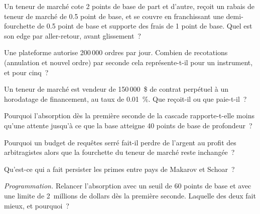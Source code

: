\begin{exercise}[$\star$]\label{exo:hf:crypto-high-frequency-trading-on-centralised-venues:1}
Un teneur de marché cote 2 points de base de part et d'autre, reçoit un rabais de teneur de marché de 0.5 point de base, et se couvre en franchissant
une demi-fourchette de 0.5 point de base et supporte des frais de 1 point de base. Quel est son edge par aller-retour, avant glissement~?
\end{exercise}

\begin{exercise}[$\star$]\label{exo:hf:crypto-high-frequency-trading-on-centralised-venues:2}
Une plateforme autorise 200\,000 ordres par jour. Combien de recotations (annulation et nouvel ordre) par seconde cela représente-t-il pour un instrument, et pour cinq~?
\end{exercise}

\begin{exercise}[$\star$]\label{exo:hf:crypto-high-frequency-trading-on-centralised-venues:3}
Un teneur de marché est vendeur de 150\,000~\$ de contrat perpétuel à un horodatage de financement, au taux de 0.01~\%. Que reçoit-il ou que paie-t-il~?
\end{exercise}

\begin{exercise}[$\star\star$]\label{exo:hf:crypto-high-frequency-trading-on-centralised-venues:4}
Pourquoi l'absorption dès la première seconde de la cascade rapporte-t-elle moins qu'une attente jusqu'à ce que la base atteigne 40 points de base de profondeur~?
\end{exercise}

\begin{exercise}[$\star\star$]\label{exo:hf:crypto-high-frequency-trading-on-centralised-venues:5}
Pourquoi un budget de requêtes serré fait-il perdre de l'argent au profit des arbitragistes alors que la fourchette du teneur de marché reste inchangée~?
\end{exercise}

\begin{exercise}[$\star\star$]\label{exo:hf:crypto-high-frequency-trading-on-centralised-venues:6}
Qu'est-ce qui a fait persister les primes entre pays de Makarov et Schoar~?
\end{exercise}

\begin{exercise}[$\star\star\star$]\label{exo:hf:crypto-high-frequency-trading-on-centralised-venues:7}
\emph{Programmation.} Relancer l'absorption avec un seuil de 60 points de base et avec une limite de 2~millions de dollars dès la première seconde. Laquelle des deux fait mieux, et pourquoi~?
\end{exercise}

